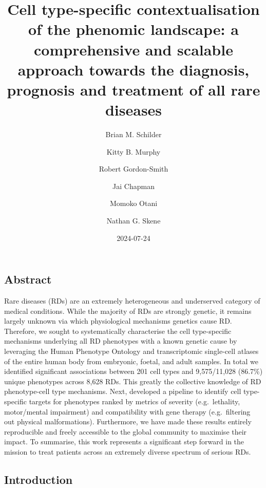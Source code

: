 \documentclass[
]{article}
\title{Cell type-specific contextualisation of the phenomic landscape: a
comprehensive and scalable approach towards the diagnosis, prognosis and
treatment of all rare diseases}
\author{Brian M. Schilder \and Kitty B. Murphy \and Robert
Gordon-Smith \and Jai Chapman \and Momoko Otani \and Nathan G. Skene}
\date{2024-07-24}
\begin{document}
\maketitle


\newpage{}

\subsection{Abstract}\label{abstract}

Rare diseases (RDs) are an extremely heterogeneous and underserved
category of medical conditions. While the majority of RDs are strongly
genetic, it remains largely unknown via which physiological mechanisms
genetics cause RD. Therefore, we sought to systematically characterise
the cell type-specific mechanisms underlying all RD phenotypes with a
known genetic cause by leveraging the Human Phenotype Ontology and
transcriptomic single-cell atlases of the entire human body from
embryonic, foetal, and adult samples. In total we identified significant
associations between 201 cell types and 9,575/11,028 (86.7\%) unique
phenotypes across 8,628 RDs. This greatly the collective knowledge of RD
phenotype-cell type mechanisms. Next, developed a pipeline to identify
cell type-specific targets for phenotypes ranked by metrics of severity
(e.g.~lethality, motor/mental impairment) and compatibility with gene
therapy (e.g.~filtering out physical malformations). Furthermore, we
have made these results entirely reproducible and freely accessible to
the global community to maximise their impact. To summarise, this work
represents a significant step forward in the mission to treat patients
across an extremely diverse spectrum of serious RDs.

\subsection{Introduction}\label{sec-introduction}
\end{document}
